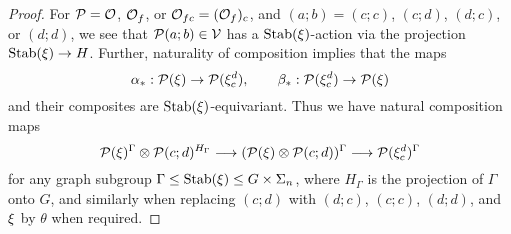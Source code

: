 \documentclass[a4paper,10pt
,draft
]{article}%
\renewcommand{\1}{\ensuremath{\mathbb{id}}}
\begin{document}
\begin{proof}
      For $\mathcal{P} = \mathcal{O}$, $\mathcal{O}_f$, or $\mathcal{O}_{f c} = (\mathcal{O}_f)_c$,
      and $(a;b) = (c;c)$, $(c;d)$, $(d;c)$, or $(d;d)$,
      we see that $\mathcal{P}(a;b) \in \mathcal V$ has a $\mathrm{Stab}(\xi)$-action
      via the projection $\mathrm{Stab}(\xi) \to H$.
      Further, naturality of composition implies that the maps
      \begin{equation}
            \alpha_{\**}: \P(\ksi) \to \P(\ksi_c^d),
            \qquad
            \beta_{\**}: \P(\ksi_c^d) \to \P(\ksi)
      \end{equation}
      and their composites are $\mathrm{Stab}(\xi)$-equivariant.
      Thus we have natural composition maps
      \begin{equation}
            \mathcal{P}(\xi)^\Gamma \otimes \mathcal{P}(c;d)^{H_\Gamma} \longrightarrow
            (\mathcal{P}(\xi) \otimes \mathcal{P}(c;d))^\Gamma \longrightarrow
            \mathcal{P}(\xi_c^d)^\Gamma
      \end{equation}
      for any graph subgroup $\Gamma \leq \mathrm{Stab}(\xi) \leq G \times \Sigma_n$,
      where $H_\Gamma$ is the projection of $\Gamma$ onto $G$,
      and similarly when replacing $(c;d)$ with $(d;c)$, $(c;c)$, $(d;d)$,
      and $\xi$ by $\theta$ when required.
      

\end{proof}
\end{document}
